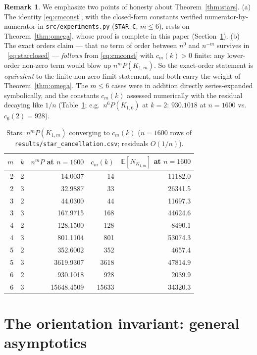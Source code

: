 \documentclass[11pt,a4paper]{article}
\theoremstyle{definition}
\newtheorem*{remark}{Remark}
\theoremstyle{definition}
\begin{document}
\begin{remark}
We emphasize two points of honesty about Theorem~\ref{thm:stars}.
(a) The identity \eqref{eq:cmconst}, with the closed-form constants verified
numerator-by-numerator in \texttt{src/experiments.py} (\texttt{STAR\_C},
$m\le6$), rests on Theorem~\ref{thm:omega}, whose proof is complete in this paper
(Section~\ref{sec:omega}).
(b) The exact orders claim — that \emph{no} term of order between $n^{0}$ and
$n^{-m}$ survives in ~\eqref{eq:starclosed} — \emph{follows} from
\eqref{eq:cmconst} with $c_m(k)>0$ finite: any lower-order non-zero term would blow
up $n^{m}P(K_{1,m})$. So the exact-order statement is \emph{equivalent} to the
finite-non-zero-limit statement, and both carry the weight of
Theorem~\ref{thm:omega}. The $m\leq6$ cases were in addition directly
series-expanded symbolically, and the constants $c_m(k)$ assessed numerically
with the residual decaying like $1/n$ (Table~\ref{tab:cm}; e.g.\
$n^{6}P(K_{1,6})$ at $k=2$: $930.1018$ at $n=1600$ vs.\ $c_6(2)=928$).
\end{remark}

\begin{table}[t]
\centering
\caption{Stars: $n^{m}P(K_{1,m})$ converging to $c_m(k)$ ($n=1600$ rows of
\texttt{results/star\_cancellation.csv}; residuals $O(1/n)$).}
\label{tab:cm}
\begin{tabular}{rrrrr}
\toprule
$m$ & $k$ & $n^{m}P$ at $n=1600$ & $c_m(k)$ & $\mathbb E[N_{K_{1,m}}]$ at $n=1600$\\
\midrule
2 & 2 & 14.0037 & 14 & 11182.0\\
2 & 3 & 32.9887 & 33 & 26341.5\\
3 & 2 & 44.0300 & 44 & 11697.3\\
3 & 3 & 167.9715 & 168 & 44624.6\\
4 & 2 & 128.1500 & 128 & 8490.1\\
4 & 3 & 801.1104 & 801 & 53074.3\\
5 & 2 & 352.6002 & 352 & 4657.4\\
5 & 3 & 3619.9307 & 3618 & 47814.9\\
6 & 2 & 930.1018 & 928 & 2039.9\\
6 & 3 & 15648.4509 & 15633 & 34320.3\\
\bottomrule
\end{tabular}
\end{table}

\section{The orientation invariant: general asymptotics}\label{sec:omega}
\end{document}
